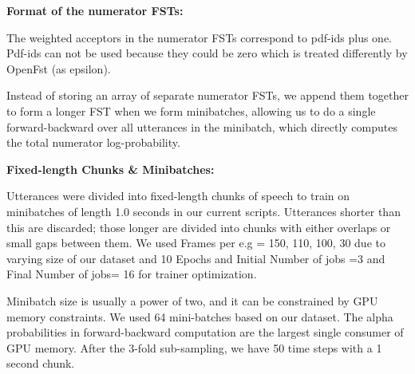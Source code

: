 
\textbf{Format of the numerator FSTs:}

The weighted acceptors in the numerator FSTs correspond to pdf-ids plus one. Pdf-ids can not be used because they could be zero which is treated differently by OpenFst (as epsilon). 

Instead of storing an array of separate numerator FSTs, we append them together to form a longer FST when we form minibatches, allowing us to do a single forward-backward over all utterances in the minibatch, which directly computes the total numerator log-probability. %

\textbf{Fixed-length Chunks \& Minibatches:}

Utterances were divided into fixed-length chunks of speech to train on minibatches of length 1.0 seconds in our current scripts. Utterances shorter than this are discarded; those longer are divided into chunks with either overlaps or small gaps between them. We used Frames per e.g = 150, 110, 100, 30 due to varying size of our dataset and 10 Epochs and Initial Number of jobs =3 and Final Number of jobs= 16 for trainer optimization.  


Minibatch size is usually a power of two, and it can be constrained by GPU memory constraints. We used 64 mini-batches based on our dataset. The alpha probabilities in forward-backward computation are the largest single consumer of GPU memory. After the 3-fold sub-sampling, we have 50 time steps with a 1 second chunk. 



